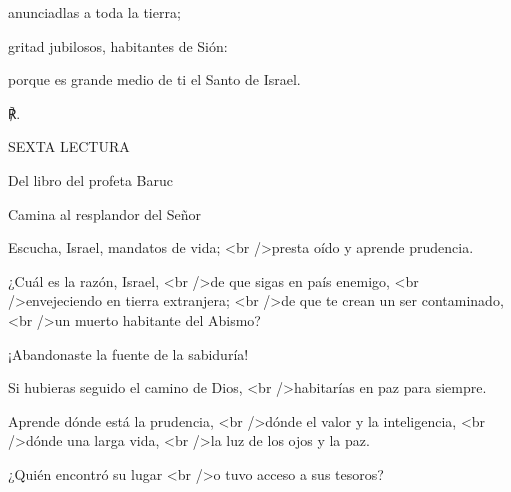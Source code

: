 			\begin{readtabbed}anunciadlas a toda la tierra;\end{readtabbed}
			
			\begin{readtabbed}gritad jubilosos, habitantes de Sión:\end{readtabbed}
			
			\begin{readtabbed}porque es grande medio de ti el Santo de Israel. \begin{readred}℟.\end{readred}\end{readtabbed}
			
			\begin{readtitle}SEXTA LECTURA\end{readtitle}
			
			\begin{readbook}Del libro del profeta Baruc \end{readbook}
			
			\begin{readtheme}Camina al resplandor del Señor\end{readtheme}
			
			\begin{readtalk}Escucha, Israel, mandatos de vida; <br />presta oído y aprende prudencia. \end{readtalk}
			
			\begin{readtalk}¿Cuál es la razón, Israel, <br />de que sigas en país enemigo, <br />envejeciendo en tierra extranjera; <br />de que te crean un ser contaminado, <br />un muerto habitante del Abismo? \end{readtalk}
			
			\begin{readtalk}¡Abandonaste la fuente de la sabiduría! \end{readtalk}
			
			\begin{readtalk}Si hubieras seguido el camino de Dios, <br />habitarías en paz para siempre. \end{readtalk}
			
			\begin{readtalk}Aprende dónde está la prudencia, <br />dónde el valor y la inteligencia, <br />dónde una larga vida, <br />la luz de los ojos y la paz. \end{readtalk}
			
			\begin{readtalk}¿Quién encontró su lugar <br />o tuvo acceso a sus tesoros? \end{readtalk}
			

